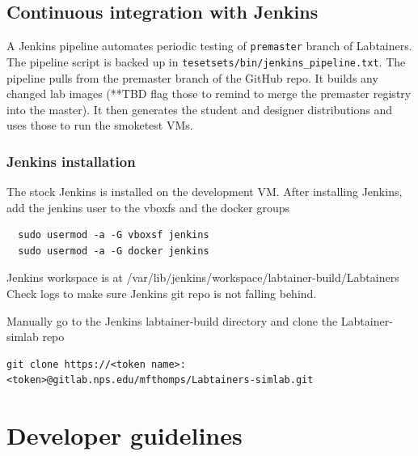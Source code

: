 \documentclass[12pt]{article}
\begin{document}
\subsection{Continuous integration with Jenkins}
A Jenkins pipeline automates periodic testing of {\tt premaster} branch of Labtainers.  The pipeline script is backed up in
{\tt tesetsets/bin/jenkins\_pipeline.txt}.   The pipeline pulls from the premaster branch of the GitHub repo.  It builds any
changed lab images (**TBD flag those to remind to merge the premaster registry into the master).  It then generates the
student and designer distributions and uses those to run the smoketest VMs.

\subsubsection{Jenkins installation}
The stock Jenkins is installed on the development VM.
After installing Jenkins, add the jenkins user to the vboxfs and the docker groups
\begin{verbatim}
  sudo usermod -a -G vboxsf jenkins
  sudo usermod -a -G docker jenkins
\end{verbatim}

Jenkins workspace is at /var/lib/jenkins/workspace/labtainer-build/Labtainers
Check logs to make sure Jenkins git repo is not falling behind.

Manually go to the Jenkins labtainer-build directory and clone the Labtainer-simlab repo
\begin{verbatim}
git clone https://<token name>:<token>@gitlab.nps.edu/mfthomps/Labtainers-simlab.git
\end{verbatim}

\section{Developer guidelines}
\end{document}
